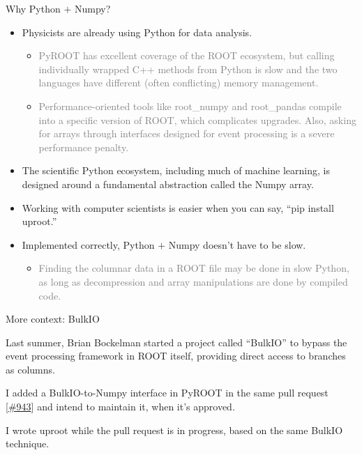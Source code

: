 \documentclass[aspectratio=169]{beamer}
\begin{document}
\begin{frame}{Why Python $+$ Numpy?}
\vspace{0.25 cm}
\begin{itemize}\setlength{\itemsep}{0.35 cm}
\item Physicists are already using Python for data analysis.

\begin{itemize}
\item \textcolor{gray}{PyROOT has excellent coverage of the ROOT ecosystem, but calling individually wrapped C++ methods from Python is slow and the two languages have different (often conflicting) memory management.}

\item \textcolor{gray}{Performance-oriented tools like root\_numpy and root\_pandas compile into a specific version of ROOT, which complicates upgrades. Also, asking for arrays through interfaces designed for event processing is a severe performance penalty.}
\end{itemize}

\item The scientific Python ecosystem, including much of machine learning, is designed around a fundamental abstraction called the Numpy array.

\item Working with computer scientists is easier when you can say, ``pip install uproot.''

\item Implemented correctly, Python $+$ Numpy doesn't have to be slow.

\begin{itemize}
\item \textcolor{gray}{Finding the columnar data in a ROOT file may be done in slow Python, as long as decompression and array manipulations are done by compiled code.}
\end{itemize}
\end{itemize}
\end{frame}

\begin{frame}{More context: BulkIO}
\vspace{0.75 cm}
\begin{center}
\begin{minipage}{0.8\linewidth}
Last summer, Brian Bockelman started a project called ``BulkIO'' to bypass the event processing framework in ROOT itself, providing direct access to branches as columns.

\vspace{0.75 cm}
I added a BulkIO-to-Numpy interface in PyROOT in the same pull request [\textcolor{blue}{\href{https://github.com/root-project/root/pull/943}{\#943}}] and intend to maintain it, when it's approved.

\vspace{0.75 cm}
I wrote uproot while the pull request is in progress, based on the same BulkIO technique.
\end{minipage}
\end{center}
\end{frame}
\end{document}
